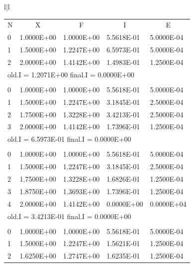 \begin{figure}[H]
    \centering
    \tiny
    \scriptsize{\setlength{\tabcolsep}{.4em}
    \begin{tabular}{l|l}
        \begin{tabular}{lllll}
            \multicolumn{1}{l}{N} & \multicolumn{1}{c}{X} &
            \multicolumn{1}{c}{F} & \multicolumn{1}{c}{I} &
            \multicolumn{1}{c}{E} \\
            0 & 1.0000E+00 & 1.0000E+00 & 5.5618E-01 & 5.0000E-04 \\
            1 & 1.5000E+00 & 1.2247E+00 & 6.5973E-01 & 5.0000E-04 \\
            2 & 2.0000E+00 & 1.4142E+00 & 1.4983E-01 & 1.2500E-04 \\
            \multicolumn{5}{l}{old.I = 1.2071E+00 \hfill final.I = 0.0000E+00} \\
            \\
            0 & 1.0000E+00 & 1.0000E+00 & 5.5618E-01 & 5.0000E-04 \\
            1 & 1.5000E+00 & 1.2247E+00 & 3.1845E-01 & 2.5000E-04 \\
            2 & 1.7500E+00 & 1.3228E+00 & 3.4213E-01 & 2.5000E-04 \\
            3 & 2.0000E+00 & 1.4142E+00 & 1.7396E-01 & 1.2500E-04 \\
            \multicolumn{5}{l}{old.I = 6.5973E-01 \hfill final.I = 0.0000E+00} \\
            \\
            0 & 1.0000E+00 & 1.0000E+00 & 5.5618E-01 & 5.0000E-04 \\
            1 & 1.5000E+00 & 1.2247E+00 & 3.1845E-01 & 2.5000E-04 \\
            2 & 1.7500E+00 & 1.3228E+00 & 1.6826E-01 & 1.2500E-04 \\
            3 & 1.8750E+00 & 1.3693E+00 & 1.7396E-01 & 1.2500E-04 \\
            4 & 2.0000E+00 & 1.4142E+00 & 0.0000E+00 & 0.0000E+04 \\
            \multicolumn{5}{l}{old.I = 3.4213E-01 \hfill final.I = 0.0000E+00} \\
            \\
            0 & 1.0000E+00 & 1.0000E+00 & 5.5618E-01 & 5.0000E-04 \\
            1 & 1.5000E+00 & 1.2247E+00 & 1.5621E-01 & 1.2500E-04 \\
            2 & 1.6250E+00 & 1.2747E+00 & 1.6235E-01 & 1.2500E-04 \\

\end{tabular}
\end{tabular}}
\end{figure}
